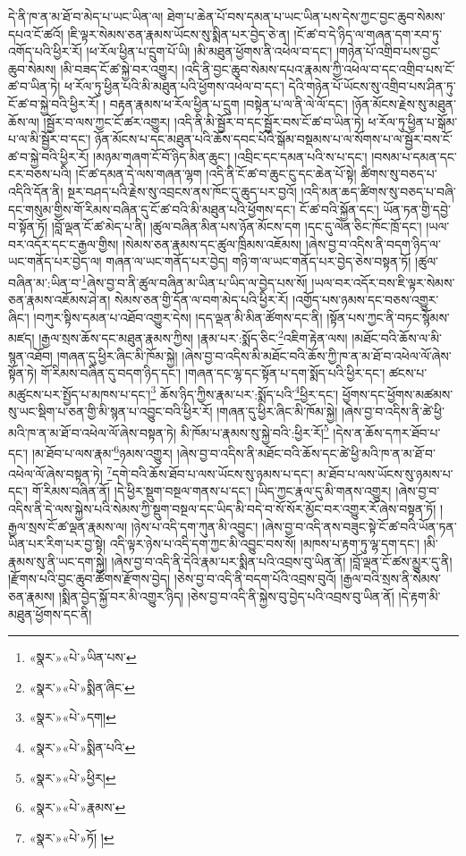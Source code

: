 དེ་ནི་ཁ་ན་མ་ཐོ་བ་མེད་པ་ཡང་ཡིན་ལ། ཐེག་པ་ཆེན་པོ་བས་དམན་པ་ཡང་ཡིན་པས་དེས་ཀྱང་བྱང་ཆུབ་སེམས་དཔའ་ངོ་ཚའོ། །ཇི་ལྟར་སེམས་ཅན་རྣམས་ཡོངས་སུ་སྨིན་པར་བྱེད་ཅེ་ན། །ངོ་ཚ་བ་དེ་ཉིད་ལ་གཞན་དག་རབ་ཏུ་འགོད་པའི་ཕྱིར་རོ། །ཕ་རོལ་ཕྱིན་པ་དྲུག་པོ་ཡི། །མི་མཐུན་ཕྱོགས་ནི་འཕེལ་བ་དང་། །གཉེན་པོ་འགྲིབ་པས་བྱང་ཆུབ་སེམས། །མི་བཟད་ངོ་ཚ་སྐྱེ་བར་འགྱུར། །འདི་ནི་བྱང་ཆུབ་སེམས་དཔའ་རྣམས་ཀྱི་འཕེལ་བ་དང་འགྲིབ་པས་ངོ་ཚ་བ་ཡིན་ཏེ། ཕ་རོལ་ཏུ་ཕྱིན་པའི་མི་མཐུན་པའི་ཕྱོགས་འཕེལ་བ་དང་། དེའི་གཉེན་པོ་ཡོངས་སུ་འགྲིབ་པས་ཤིན་ཏུ་ངོ་ཚ་བ་སྐྱེ་བའི་ཕྱིར་རོ། །
བརྟན་རྣམས་ཕ་རོལ་ཕྱིན་པ་དྲུག །བསྟེན་པ་ལ་ནི་ལེ་ལོ་དང་། །ཉོན་མོངས་རྗེས་སུ་མཐུན་ཆོས་ལ། །སྦྱོར་བ་ལས་ཀྱང་ངོ་ཚར་འགྱུར། །འདི་ནི་མི་སྦྱོར་བ་དང་སྦྱོར་བས་ངོ་ཚ་བ་ཡིན་ཏེ། ཕ་རོལ་ཏུ་ཕྱིན་པ་སྒོམ་པ་ལ་མི་སྦྱོར་བ་དང་། ཉོན་མོངས་པ་དང་མཐུན་པའི་ཆོས་དབང་པོའི་སྒོམ་བསྡམས་པ་ལ་སོགས་པ་ལ་སྦྱོར་བས་ངོ་ཚ་བ་སྐྱེ་བའི་ཕྱིར་རོ། །མཉམ་གཞག་ངོ་བོ་ཉིད་མིན་ཆུང་། །འབྲིང་དང་དམན་པའི་ས་པ་དང་། །བསམ་པ་དམན་དང་ངར་བཅས་པའི། །ངོ་ཚ་དམན་དེ་ལས་གཞན་ལྷག །འདི་ནི་ངོ་ཚ་བ་ཆུང་ངུ་དང་ཆེན་པོ་སྟེ། ཚིགས་སུ་བཅད་པ་འདིའི་དོན་ནི། སྔར་བཤད་པའི་རྗེས་སུ་འབྲངས་ནས་ཁོང་དུ་ཆུད་པར་བྱའོ། །འདི་མན་ཆད་ཚིགས་སུ་བཅད་པ་བཞི་དང་གསུམ་གྱིས་གོ་རིམས་བཞིན་དུ་ངོ་ཚ་བའི་མི་མཐུན་པའི་ཕྱོགས་དང་། ངོ་ཚ་བའི་སྐྱོན་དང་། ཡོན་ཏན་གྱི་དབྱེ་བ་སྟོན་ཏོ། །བློ་ལྡན་ངོ་ཚ་མེད་པ་ནི། །ཚུལ་བཞིན་མིན་པས་ཉོན་མོངས་དག །དང་དུ་ལེན་ཅིང་ཁོང་ཁྲོ་དང་། །ཡལ་བར་འདོར་དང་ང་རྒྱལ་གྱིས། །སེམས་ཅན་རྣམས་དང་ཚུལ་ཁྲིམས་འཇོམས། །ཞེས་བྱ་བ་འདིས་ནི་བདག་ཉིད་ལ་ཡང་གནོད་པར་བྱེད་ལ། གཞན་ལ་ཡང་གནོད་པར་བྱེད། གཉི་ག་ལ་ཡང་གནོད་པར་བྱེད་ཅེས་བསྟན་ཏོ། །ཚུལ་བཞིན་མ་:ཡིན་བ་\footnote{«སྣར་»«པེ་»ཡིན་པས་}ཞེས་བྱ་བ་ནི་ཚུལ་བཞིན་མ་ཡིན་པ་ཡིད་ལ་བྱེད་པས་སོ། །ཡལ་བར་འདོར་བས་ཇི་ལྟར་སེམས་ཅན་རྣམས་འཇོམས་ཤེ་ན། སེམས་ཅན་གྱི་དོན་ལ་བག་མེད་པའི་ཕྱིར་རོ། །འགྱོད་པས་ཉམས་དང་བཅས་འགྱུར་ཞིང་། །བཀུར་སྟིས་དམན་པ་འཐོབ་འགྱུར་དེས། །དད་ལྡན་མི་མིན་ཚོགས་དང་ནི། །སྟོན་པས་ཀྱང་ནི་བཏང་སྙོམས་མཛད། །རྒྱལ་སྲས་ཆོས་དང་མཐུན་རྣམས་ཀྱིས། །རྣམ་པར་:སྨོད་ཅིང་\footnote{«སྣར་»«པེ་»སྨིན་ཞིང་}འཇིག་རྟེན་ལས། །མཐོང་བའི་ཆོས་ལ་མི་སྙན་འཐོབ། །གཞན་དུ་ཕྱིར་ཞིང་མི་ཁོམ་སྐྱེ། །ཞེས་བྱ་བ་འདིས་མི་མཐོང་བའི་ཆོས་ཀྱི་ཁ་ན་མ་ཐོ་བ་འཕེལ་ལོ་ཞེས་སྟོན་ཏེ། གོ་རིམས་བཞིན་དུ་བདག་ཉིད་དང་། །གཞན་དང་ལྷ་དང་སྟོན་པ་དག་སྨོད་པའི་ཕྱིར་དང་། ཚངས་པ་མཚུངས་པར་སྤྱོད་པ་མཁས་པ་དང་།\footnote{«སྣར་»«པེ་»དག།} ཆོས་ཉིད་ཀྱིས་རྣམ་པར་:སྨོད་པའི་\footnote{«སྣར་»«པེ་»སྨིན་པའི་}ཕྱིར་དང་། ཕྱོགས་དང་ཕྱོགས་མཚམས་སུ་ཡང་སྡིག་པ་ཅན་གྱི་མི་སྙན་པ་འབྱུང་བའི་ཕྱིར་རོ། །གཞན་དུ་ཕྱིར་ཞིང་མི་ཁོམ་སྐྱེ། །ཞེས་བྱ་བ་འདིས་ནི་ཚེ་ཕྱི་མའི་ཁ་ན་མ་ཐོ་བ་འཕེལ་ལོ་ཞེས་བསྟན་ཏེ། མི་ཁོམ་པ་རྣམས་སུ་སྐྱེ་བའི་:ཕྱིར་རོ།\footnote{«སྣར་»«པེ་»ཕྱིར།} །དེས་ན་ཆོས་དཀར་ཐོབ་པ་དང་། །མ་ཐོབ་པ་ལས་རྣམ་\footnote{«སྣར་»«པེ་»རྣམས་}ཉམས་འགྱུར། །ཞེས་བྱ་བ་འདིས་ནི་མཐོང་བའི་ཆོས་དང་ཚེ་ཕྱི་མའི་ཁ་ན་མ་ཐོ་བ་འཕེལ་ལོ་ཞེས་བསྟན་ཏེ། \footnote{«སྣར་»«པེ་»ཏོ། ། }དགེ་བའི་ཆོས་ཐོབ་པ་ལས་ཡོངས་སུ་ཉམས་པ་དང་། མ་ཐོབ་པ་ལས་ཡོངས་སུ་ཉམས་པ་དང་། གོ་རིམས་བཞིན་ནོ། །དེ་ཕྱིར་སྡུག་བསྔལ་གནས་པ་དང་། །ཡིད་ཀྱང་རྣལ་དུ་མི་གནས་འགྱུར། །ཞེས་བྱ་བ་འདིས་ནི་དེ་ལས་སྐྱེས་པའི་སེམས་ཀྱི་སྡུག་བསྔལ་དང་ཡིད་མི་བདེ་བ་སོ་སོར་མྱོང་བར་འགྱུར་རོ་ཞེས་བསྟན་ཏོ། །རྒྱལ་སྲས་ངོ་ཚ་ལྡན་རྣམས་ལ། །ཉེས་པ་འདི་དག་ཀུན་མི་འབྱུང་། །ཞེས་བྱ་བ་འདི་ནས་བཟུང་སྟེ་ངོ་ཚ་བའི་ཡོན་ཏན་ཡིན་པར་རིག་པར་བྱ་སྟེ། འདི་ལྟར་ཉེས་པ་འདི་དག་ཀྱང་མི་འབྱུང་བས་སོ། །མཁས་པ་རྟག་ཏུ་ལྷ་དག་དང་། །མི་རྣམས་སུ་ནི་ཡང་དག་སྐྱེ། །ཞེས་བྱ་བ་འདི་ནི་དེའི་རྣམ་པར་སྨིན་པའི་འབྲས་བུ་ཡིན་ནོ། །བློ་ལྡན་ངོ་ཚས་མྱུར་དུ་ནི། །རྫོགས་པའི་བྱང་ཆུབ་ཚོགས་རྫོགས་བྱེད། །ཅེས་བྱ་བ་འདི་ནི་བདག་པོའི་འབྲས་བུའོ། །རྒྱལ་བའི་སྲས་ནི་སེམས་ཅན་རྣམས། །སྨིན་བྱེད་སྐྱོ་བར་མི་འགྱུར་ཉིད། །ཅེས་བྱ་བ་འདི་ནི་སྐྱེས་བུ་བྱེད་པའི་འབྲས་བུ་ཡིན་ནོ། །དེ་རྟག་མི་མཐུན་ཕྱོགས་དང་ནི། 